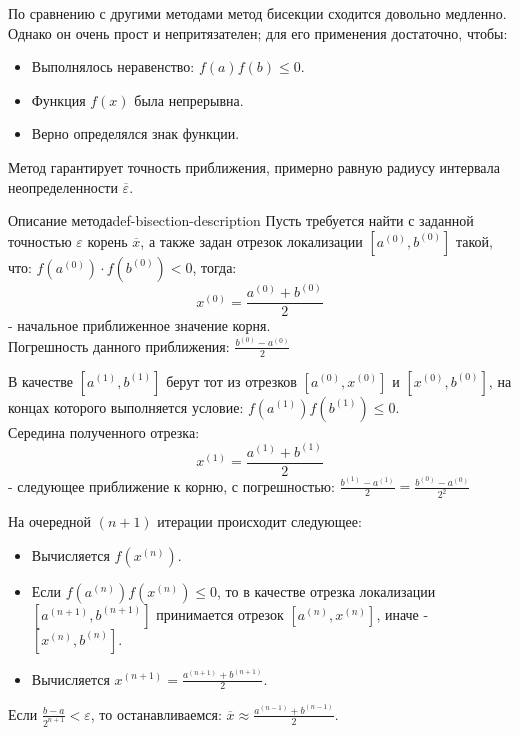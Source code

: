 \documentclass[14pt]{extarticle}
\begin{document}
        По сравнению с другими методами метод бисекции сходится довольно медленно. Однако он очень прост и непритязателен; для его применения достаточно, чтобы: 
        \begin{itemize}
            \item Выполнялось неравенство: $f(a)f(b) \leq 0$.
            \item Функция $f(x)$ была непрерывна.
            \item Верно определялся знак функции.
        \end{itemize}
            
        \vspace{\baselineskip}

        Метод гарантирует точность приближения, примерно равную радиусу интервала неопределенности $\overline{\varepsilon}$.

        \begin{definition}{Описание метода}{def-bisection-description}
            Пусть требуется найти с заданной точностью $\varepsilon$ корень $\overline{x}$, а также задан отрезок локализации $[a^{(0)}, b^{(0)}]$ такой, что: $f(a^{(0)}) \cdot f(b^{(0)}) < 0$, тогда:
            $$x^{(0)} = \frac{a^{(0)} + b^{(0)}}{2}$$
            - начальное приближенное значение корня.\\
            Погрешность данного приближения: $\frac{b^{(0)} - a^{(0)}}{2}$

            \vspace{\baselineskip}

            В качестве $[a^{(1)}, b^{(1)}]$ берут тот из отрезков $[a^{(0)}, x^{(0)}]$ и $[x^{(0)}, b^{(0)}]$, на концах которого выполняется условие: $f(a^{(1)})f(b^{(1)}) \leq 0$.\\
            Середина полученного отрезка: 
            $$x^{(1)} = \frac{a^{(1)} + b^{(1)}}{2}$$ 
            - следующее приближение к корню, с погрешностью: $\frac{b^{(1)} - a^{(1)}}{2} = \frac{b^{(0)} - a^{(0)}}{2^{2}}$

            \vspace{\baselineskip}

            На очередной $(n + 1)$ итерации происходит следующее:
            \begin{itemize}
                \item Вычисляется $f(x^{(n)})$.
                \item Если $f(a^{(n)})f(x^{(n)}) \leq 0$, то в качестве отрезка локализации $[a^{(n + 1)}, b^{(n + 1)}]$ принимается отрезок $[a^{(n)}, x^{(n)}]$, иначе - $[x^{(n)}, b^{(n)}]$.
                \item Вычисляется $x^{(n + 1)} = \frac{a^{(n + 1)} + b^{(n + 1)}}{2}$.
            \end{itemize}

            \vspace{\baselineskip}

            Если $\frac{b - a}{2^{n + 1}} < \varepsilon$, то останавливаемся: $\overline{x} \approx \frac{a^{(n - 1)} + b^{(n - 1)}}{2}$.
        \end{definition}
\end{document}
